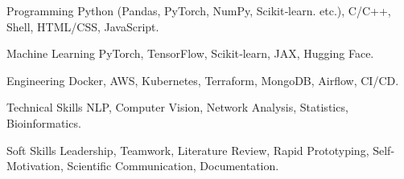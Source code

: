 

\begin{cvskills}

  \cvskill
    {Programming} %
    {Python (Pandas, PyTorch, NumPy, Scikit‑learn. etc.), C/C++, Shell, HTML/CSS, JavaScript.} %

  \cvskill
    {Machine Learning} %
    {PyTorch, TensorFlow, Scikit‑learn, JAX, Hugging Face.} %

  \cvskill
    {Engineering} %
    {Docker, AWS, Kubernetes, Terraform, MongoDB, Airflow, CI/CD.} %
    
  \cvskill
    {Technical Skills} %
    {NLP, Computer Vision, Network Analysis, Statistics, Bioinformatics.} %

  \cvskill
    {Soft Skills} %
    {Leadership, Teamwork, Literature Review, Rapid Prototyping, Self-Motivation, Scientific Communication, Documentation.} %

\end{cvskills}
